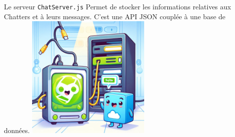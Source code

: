 \documentclass{beamer}
\begin{document}
    \begin{frame}{Le serveur \lstinline{ChatServer.js}}
        Permet de stocker les informations relatives aux Chatters et à leurs messages.
        \bigbreak
        C'est une API JSON couplée à une base de données.
        \bigbreak
        \centering
        \includegraphics[width=6cm]{image/api-server}
    \end{frame}
\end{document}
